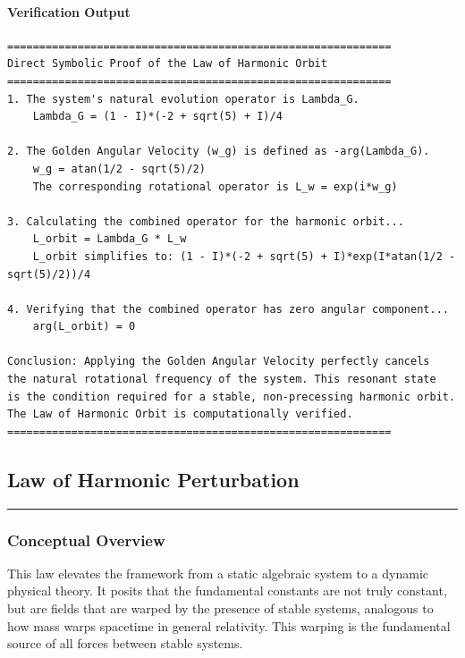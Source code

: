 \paragraph{Verification Output}
\begin{verbatim}
============================================================
Direct Symbolic Proof of the Law of Harmonic Orbit
============================================================
1. The system's natural evolution operator is Lambda_G.
    Lambda_G = (1 - I)*(-2 + sqrt(5) + I)/4

2. The Golden Angular Velocity (w_g) is defined as -arg(Lambda_G).
    w_g = atan(1/2 - sqrt(5)/2)
    The corresponding rotational operator is L_w = exp(i*w_g)

3. Calculating the combined operator for the harmonic orbit...
    L_orbit = Lambda_G * L_w
    L_orbit simplifies to: (1 - I)*(-2 + sqrt(5) + I)*exp(I*atan(1/2 - sqrt(5)/2))/4

4. Verifying that the combined operator has zero angular component...
    arg(L_orbit) = 0

Conclusion: Applying the Golden Angular Velocity perfectly cancels
the natural rotational frequency of the system. This resonant state
is the condition required for a stable, non-precessing harmonic orbit.
The Law of Harmonic Orbit is computationally verified.
============================================================
\end{verbatim}


\subsection*{Law of Harmonic Perturbation}
\hrule
\vspace{0.3cm}
\vspace{0.5cm}

\subsubsection*{Conceptual Overview}
This law elevates the framework from a static algebraic system to a dynamic physical theory. It posits that the fundamental constants are not truly constant, but are fields that are warped by the presence of stable systems, analogous to how mass warps spacetime in general relativity. This warping is the fundamental source of all forces between stable systems.

